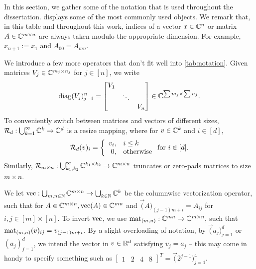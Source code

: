In this section, we gather some of the notation that is used throughout the dissertation.   displays some of the most commonly used objects.  We remark that, in this table and throughout this work, indices of a vector $x \in \Cn$ or matrix $A \in \Cmxn$ are always taken modulo the appropriate dimension.  For example, $x_{n + 1} := x_1$ and $A_{00} = A_{mn}$.

{\newcommand{\env}[1]{\texttt{#1}}\renewcommand{\thefootnote}{\fnsymbol{footnote}}
  \centering \renewcommand{\arraystretch}{1.5}
}

{\renewcommand{\thefootnote}{\fnsymbol{footnote}}}

We introduce a few more operators that don't fit well into \cref{tab:notation}.  Given matrices $V_j \in \C^{m_j \times n_j}$ for $j \in [n]$, we write \[\diag(V_j)_{j = 1}^n = \begin{bmatrix} V_1 & & \\ & \ddots & \\ & & V_n \end{bmatrix} \in \C^{\sum m_j \times \sum n_j}.\]  To conveniently switch between matrices and vectors of different sizes, $\mathcal{R}_d : \bigcup_{k = 1}^\infty \C^k \to \C^d$ is a resize mapping, where for $v \in \C^k$ and $i \in [d],$ $$\mathcal{R}_d(v)_i = \left\{\begin{array}{r@{,\quad}l} v_i & i \le k \\ 0 & \text{otherwise} \end{array}\right. \text{for}\ i \in [d].$$  Similarly, $\mathcal{R}_{m \times n} : \bigcup_{k_1, k_2}^\infty \C^{k_1 \times k_2} \to \C^{m \times n}$ truncates or zero-pads matrices to size $m \times n$.  

We let $\vec : \bigcup_{m, n \in \N} \C^{m \times n} \to \bigcup_{k \in \N} \C^k$ be the columnwise vectorization operator, such that for $A \in \C^{m \times n}, \vec(A) \in \C^{m n}$ and  $\vec(A)_{(j - 1) m + i} = A_{i j}$ for $i, j \in [m] \times [n]$.  To invert $\vec$, we use $\mat_{(m, n)} : \C^{m n} \to \C^{m \times n},$ such that $\mat_{(m, n)}(v)_{ij} = v_{(j - 1) m + i}$.  By a slight overloading of notation, by $\vec(a_j)_{j = 1}^d$ or $(a_j)_{j=1}^d$, we intend the vector in $v \in \R^d$ satisfying $v_j = a_j$ -- this may come in handy to specify something such as $\begin{bmatrix} 1 & 2 & 4 & 8 \end{bmatrix}^T = \vec(2^{j - 1})_{j = 1}^4$.
